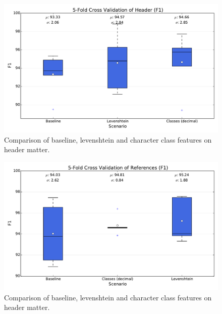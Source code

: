 \begin{figure}[h]
\center
\includegraphics[width=5.5in]{Figures/header.pdf}
\caption{Comparison of baseline, levenshtein and character class features on header matter.}
\label{fig:header}
\end{figure}

\begin{figure}[h]
\center
\includegraphics[width=5.5in]{Figures/references.pdf}
\caption{Comparison of baseline, levenshtein and character class features on header matter.}
\label{fig:references}
\end{figure}

